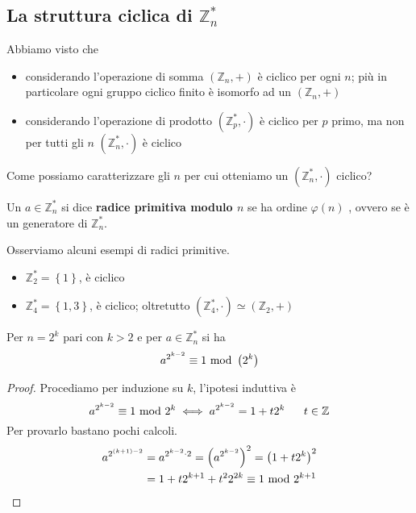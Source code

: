 \subsection{La struttura ciclica di $\mathbb{Z}_n^*$}
Abbiamo visto che 
\begin{itemize}
	\item considerando l'operazione di somma $\left(\mathbb{Z}_n,+\right)$ è ciclico per ogni $n$; più in particolare ogni gruppo ciclico finito è isomorfo ad un $\left(\mathbb{Z}_n,+\right)$
	\item considerando l'operazione di prodotto $\left(\mathbb{Z}_p^*,\cdot\right)$ è ciclico per $p$ primo, ma non per tutti gli $n$ $\left(\mathbb{Z}_n^*,\cdot\right)$ è ciclico
\end{itemize}
Come possiamo caratterizzare gli $n$ per cui otteniamo un $\left(\mathbb{Z}_n^*,\cdot\right)$ ciclico?
\begin{definizione}
	Un $a\in\mathbb{Z}_n^*$ si dice \textbf{radice primitiva modulo $n$} se ha ordine $\varphi(n)$
	, ovvero se è un generatore di $\mathbb{Z}_n^*$.
\end{definizione}
\begin{esempio}
	Osserviamo alcuni esempi di radici primitive.
	\begin{itemize}
		\item $\mathbb{Z}_2^*=\left\{1\right\}$, è ciclico
		\item $\mathbb{Z}_4^*=\left\{1,3\right\}$, è ciclico; oltretutto $\left(\mathbb{Z}_4^*,\cdot\right)\simeq\left(\mathbb{Z}_{2},+\right)$
	\end{itemize}
\end{esempio}
\begin{proposizione}
	Per $n=2^k$ pari con $k>2$ e per $a\in\mathbb{Z}_n^*$ si ha 
	\begin{equation*}
	a^{2^{k-2}}\equiv1\ \mathrm{mod}\ \left(2^k\right)
	\end{equation*} 
\end{proposizione}
\begin{proof}
	Procediamo per induzione su $k$, l'ipotesi induttiva è 
	\begin{equation*}
	a^{2^{k-2}}\equiv1\ \mathrm{mod}\ 2^k \iff a^{2^{k-2}}=1+t2^k \ \ \ \ \ t \in \mathbb{Z}
	\end{equation*}
	Per provarlo bastano pochi calcoli.
	\begin{align*}
	a^{2^{(k+1)-2}}&=a^{2^{k-2}\cdot2}=\left(a^{2^{k-2}}\right)^2=\left(1+t2^k\right)^2\\
	&= 1+t2^{k+1}+t^22^{2k}\equiv1\ \mathrm{mod}\ 2^{k+1}
	\end{align*}
\end{proof}
